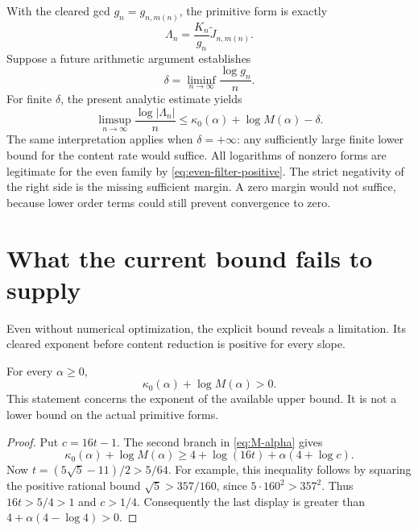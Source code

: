 With the cleared gcd $g_n=g_{n,m(n)}$, the primitive form is exactly
\begin{equation}
 \Lambda_n=\frac{K_n}{g_n}\widetilde J_{n,m(n)}.
 \label{eq:Lambda-bottleneck}
\end{equation}
Suppose a future arithmetic argument establishes
\begin{equation}
 \delta=\liminf_{n\to\infty}\frac{\log g_n}{n}.
 \label{eq:delta-content}
\end{equation}
For finite $\delta$, the present analytic estimate yields
\begin{equation}
 \limsup_{n\to\infty}\frac{\log|\Lambda_n|}{n}
 \leq\kappa_0(\alpha)+\log M(\alpha)-\delta.
 \label{eq:margin-inequality}
\end{equation}
The same interpretation applies when $\delta=+\infty$: any sufficiently large finite lower bound for the content rate would suffice. All logarithms of nonzero forms are legitimate for the even family by \eqref{eq:even-filter-positive}. The strict negativity of the right side is the missing sufficient margin. A zero margin would not suffice, because lower order terms could still prevent convergence to zero.

\section{What the current bound fails to supply}

Even without numerical optimization, the explicit bound reveals a limitation. Its cleared exponent before content reduction is positive for every slope.

\begin{proposition}
\label{prop:positive-cleared-upper}
For every $\alpha\geq0$,
\begin{equation}
 \kappa_0(\alpha)+\log M(\alpha)>0.
 \label{eq:positive-bound-rate}
\end{equation}
This statement concerns the exponent of the available upper bound. It is not a lower bound on the actual primitive forms.
\end{proposition}

\begin{proof}
Put $c=16t-1$. The second branch in \eqref{eq:M-alpha} gives
\begin{equation*}
 \kappa_0(\alpha)+\log M(\alpha)
 \geq 4+\log(16t)+\alpha(4+\log c).
\end{equation*}
Now $t=(5\sqrt5-11)/2>5/64$. For example, this inequality follows by squaring the positive rational bound $\sqrt5>357/160$, since $5\cdot160^2>357^2$. Thus $16t>5/4>1$ and $c>1/4$. Consequently the last display is greater than $4+\alpha(4-\log4)>0$.
\end{proof}

